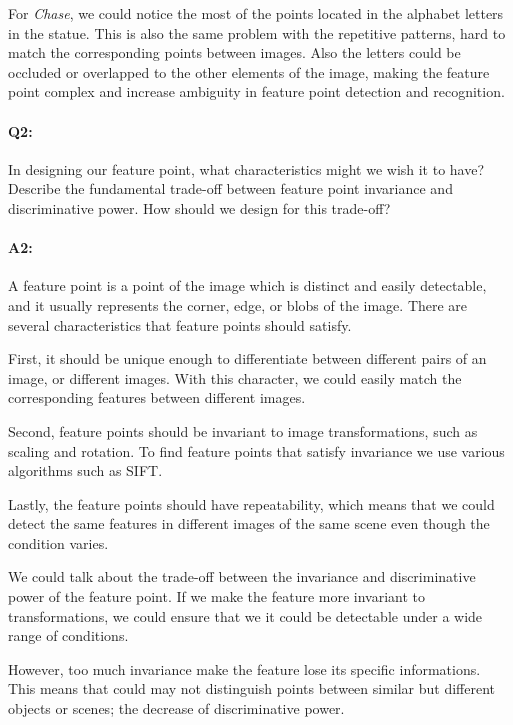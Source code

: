 For \emph{Chase}, we could notice the most of the points located in the alphabet letters in the statue. This is also the same problem with the repetitive patterns, hard to match the corresponding points between images. Also the letters could be occluded or overlapped to the other elements of the image, making the feature point complex and increase ambiguity in feature point detection and recognition.
  



\pagebreak
\paragraph{Q2:} In designing our feature point, what characteristics might we wish it to have? Describe the fundamental trade-off between feature point invariance and discriminative power. How should we design for this trade-off?

\paragraph{A2:} 
A feature point is a point of the image which is distinct and easily detectable, and it usually represents the corner, edge, or blobs of the image.
There are several characteristics that feature points should satisfy. 

First, it should be unique enough to differentiate between different pairs of an image, or different images. With this character, we could easily match the corresponding features between different images.

Second, feature points should be invariant to image transformations, such as scaling and rotation. To find feature points that satisfy invariance we use various algorithms such as SIFT.

Lastly, the feature points should have repeatability, which means that we could detect the same features in different images of the same scene even though the condition varies.

We could talk about the trade-off between the invariance and discriminative power of the feature point. 
If we make the feature more invariant to transformations, we could ensure that we it could be detectable under a wide range of conditions. 

However, too much invariance make the feature lose its specific informations. This means that could may not distinguish points between similar but different objects or scenes; the decrease of discriminative power.

